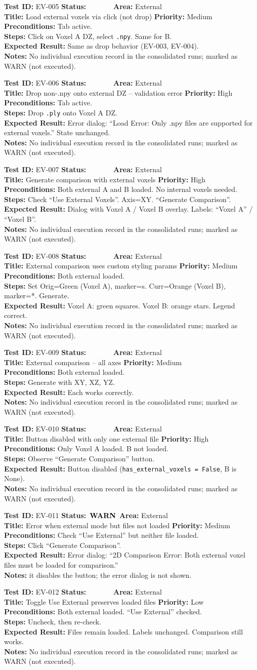 \documentclass[12pt,a4paper]{article}
\newcommand{\statuspass}{\colorbox{statusgreen}{\textcolor{white}{\textbf{\,PASS\,}}}}
\newcommand{\statuswarn}{\colorbox{statusyellow}{\textcolor{black}{\textbf{\,WARN\,}}}}
\newcommand{\testcase}[9]{%
  \smallskip
  \noindent\textbf{Test ID:} #1 \hfill \textbf{Status:} #2 \hfill \textbf{Area:} #3 \\
  \textbf{Title:} #4 \hfill \textbf{Priority:} #5 \\[0.3em]
  \textbf{Preconditions:} #6 \\[0.3em]
  \textbf{Steps:} #7 \\[0.3em]
  \textbf{Expected Result:} #8 \\
  \textbf{Notes:} #9
  \smallskip
}
\begin{document}
\testcase{EV-005}{\statuspass}{External}{Load external voxels via click (not drop)}{Medium}{Tab active.}{Click on Voxel A DZ, select \texttt{.npy}. Same for B.}{Same as drop behavior (EV-003, EV-004).}{No individual execution record in the consolidated runs; marked as WARN (not executed).}


\testcase{EV-006}{\statuspass}{External}{Drop non-.npy onto external DZ -- validation error}{High}{Tab active.}{Drop \texttt{.ply} onto Voxel A DZ.}{Error dialog: ``Load Error: Only .npy files are supported for external voxels.'' State unchanged.}{No individual execution record in the consolidated runs; marked as WARN (not executed).}


\testcase{EV-007}{\statuspass}{External}{Generate comparison with external voxels}{High}{Both external A and B loaded. No internal voxels needed.}{Check ``Use External Voxels''. Axis=XY. ``Generate Comparison''.}{Dialog with Voxel A / Voxel B overlay. Labels: ``Voxel A'' / ``Voxel B''.}{No individual execution record in the consolidated runs; marked as WARN (not executed).}


\testcase{EV-008}{\statuspass}{External}{External comparison uses custom styling params}{Medium}{Both external loaded.}{Set Orig=Green (Voxel A), marker=s. Curr=Orange (Voxel B), marker=*. Generate.}{Voxel A: green squares. Voxel B: orange stars. Legend correct.}{No individual execution record in the consolidated runs; marked as WARN (not executed).}


\testcase{EV-009}{\statuspass}{External}{External comparison -- all axes}{Medium}{Both external loaded.}{Generate with XY, XZ, YZ.}{Each works correctly.}{No individual execution record in the consolidated runs; marked as WARN (not executed).}


\testcase{EV-010}{\statuspass}{External}{Button disabled with only one external file}{High}{Only Voxel A loaded. B not loaded.}{Observe ``Generate Comparison'' button.}{Button disabled (\texttt{has\_external\_voxels = False}, B is None).}{No individual execution record in the consolidated runs; marked as WARN (not executed).}


\testcase{EV-011}{\statuswarn}{External}{Error when external mode but files not loaded}{Medium}{Check ``Use External'' but neither file loaded.}{Click ``Generate Comparison''.}{Error dialog: ``2D Comparison Error: Both external voxel files must be loaded for comparison.''}{it disables the button; the error dialog is not shown.}


\testcase{EV-012}{\statuspass}{External}{Toggle Use External preserves loaded files}{Low}{Both external loaded. ``Use External'' checked.}{Uncheck, then re-check.}{Files remain loaded. Labels unchanged. Comparison still works.}{No individual execution record in the consolidated runs; marked as WARN (not executed).}
\end{document}

